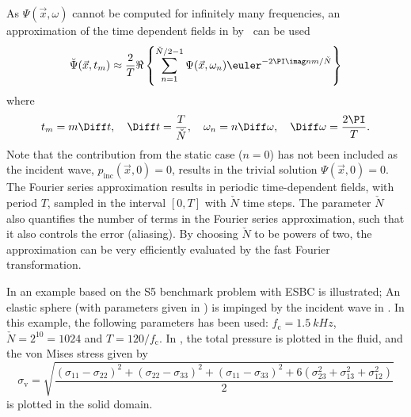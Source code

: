 As $\Psi(\vec{x},\omega)$ cannot be computed for infinitely many frequencies, an approximation of the time dependent fields in  by~\cite[p. 614]{Jensen2011coa} can be used
\begin{equation}
	\breve{\Psi}(\vec{x},t_m) \approx \frac{2}{T}\Re\left\{\sum_{n=1}^{\check{N}/2-1} \Psi(\vec{x},\omega_n)\euler^{-2\PI\imag n m/\check{N}}\right\}
\end{equation}
where
\begin{equation}
	t_m = m\Diff t, \quad \Diff t = \frac{T}{\check{N}}, \quad \omega_n = n\Diff\omega, \quad \Diff\omega = \frac{2\PI}{T}. 
\end{equation}
Note that the contribution from the static case ($n=0$) has not been included as the incident wave, $p_{\mathrm{inc}}(\vec{x},0) = 0$, results in the trivial solution $\Psi(\vec{x},0)=0$. The Fourier series approximation results in periodic time-dependent fields, with period $T$, sampled in the interval $[0,T]$ with $\check{N}$ time steps. The parameter $\check{N}$ also quantifies the number of terms in the Fourier series approximation, such that it also controls the error (aliasing). By choosing $\check{N}$ to be powers of two, the approximation can be very efficiently evaluated by the fast Fourier transformation. 

In  an example based on the S5 benchmark problem with ESBC is illustrated; An elastic sphere (with parameters given in ) is impinged by the incident wave in . In this example, the following parameters has been used: $f_{\mathrm{c}}=\SI{1.5}{kHz}$, $\check{N}=2^{10}=1024$ and $T=120/f_{\mathrm{c}}$. In , the total pressure is plotted in the fluid, and the von Mises stress given by
\begin{equation}
	\sigma_{\mathrm{v}} =  \sqrt{\frac{(\sigma_{11} - \sigma_{22})^2 + (\sigma_{22} - \sigma_{33})^2 + (\sigma_{11} - \sigma_{33})^2 + 6(\sigma_{23}^2 + \sigma_{13}^2 + \sigma_{12}^2)}{2}} 
\end{equation}
is plotted in the solid domain.

